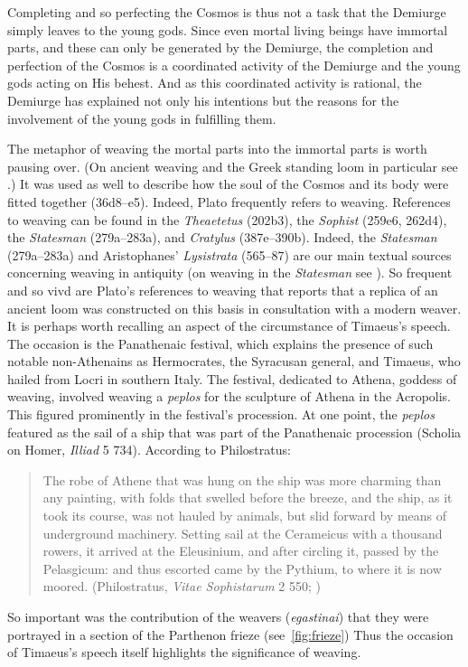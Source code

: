 Completing and so perfecting the Cosmos is thus not a task that the Demiurge simply leaves to the young gods. Since even mortal living beings have immortal parts, and these can only be generated by the Demiurge, the completion and perfection of the Cosmos is a coordinated activity of the Demiurge and the young gods acting on His behest. And as this coordinated activity is rational, the Demiurge has explained not only his intentions but the reasons for the involvement of the young gods in fulfilling them.

The metaphor of weaving the mortal parts into the immortal parts is worth pausing over. (On ancient weaving and the Greek standing loom in particular see \citealt{Burke:2010aa,Crowfoot:1936aa,Flores:2006aa,Hoffmann:1964aa}.) It was used as well to describe how the soul of the Cosmos and its body were fitted together (36d8–e5). Indeed, Plato frequently refers to weaving. References to weaving can be found in the \emph{Theaetetus} (202b3), the \emph{Sophist} (259e6, 262d4), the \emph{Statesman} (279a--283a), and \emph{Cratylus} (387e--390b). Indeed, the \emph{Statesman} (279a--283a) and Aristophanes' \emph{Lysistrata} (565--87) are our main textual sources concerning weaving in antiquity (on weaving in the \emph{Statesman} see \citealt{Cole:1991qq}). So frequent and so vivd are Plato's references to weaving that \citet[44, n1]{Skemp:1952aa} reports that a replica of an ancient loom was constructed on this basis in consultation with a modern weaver. It is perhaps worth recalling an aspect of the circumstance of Timaeus's speech. The occasion is the Panathenaic festival, which explains the presence of such notable non-Athenains as Hermocrates, the Syracusan general, and Timaeus, who hailed from Locri in southern Italy. The festival, dedicated to Athena, goddess of weaving, involved weaving a \emph{peplos} for the sculpture of Athena in the Acropolis. This figured prominently in the festival's procession. At one point, the \emph{peplos} featured as the sail of a ship that was part of the Panathenaic procession (Scholia on Homer, \emph{Illiad} 5 734). According to Philostratus: 
\begin{quote}
	The robe of Athene that was hung on the ship was more charming than any painting, with folds that swelled before the breeze, and the ship, as it took its course, was not hauled by animals, but slid forward by means of underground machinery. Setting sail at the Cerameicus with a thousand rowers, it arrived at the Eleusinium, and after circling it, passed by the Pelasgicum: and thus escorted came by the Pythium, to where it is now moored. (Philostratus, \emph{Vitae Sophistarum} 2 550; \citealt[147]{Wright:1922aa})
\end{quote}
So important was the contribution of the weavers (\emph{egastinai}) that they were portrayed in a section of the Parthenon frieze (see~\ref{fig:frieze}) Thus the occasion of Timaeus's speech itself highlights the significance of weaving. 


